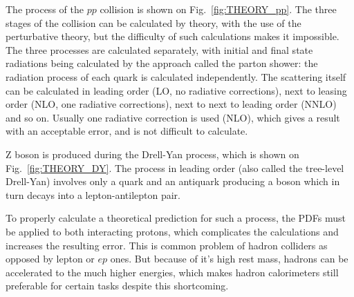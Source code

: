 The process of the $pp$ collision is shown on Fig.~\ref{fig:THEORY_pp}. The three stages of the collision can be calculated by theory, with the use of the perturbative theory, but the difficulty of such calculations makes it impossible. The three processes are calculated separately, with initial and final state radiations being calculated by the approach called the parton shower: the radiation process of each quark is calculated independently. The scattering itself can be calculated in leading order (LO, no radiative corrections), next to leasing order (NLO, one radiative corrections), next to next to leading order (NNLO) and so on. Usually one radiative correction is used (NLO), which gives a result with an acceptable error, and is not difficult to calculate.

\begin{figure}
\end{figure}

Z boson is produced during the Drell-Yan process, which is shown on Fig.~\ref{fig:THEORY_DY}. The process in leading order (also called the tree-level Drell-Yan) involves only a quark and an antiquark producing a boson which in turn decays into a lepton-antilepton pair.

To properly calculate a theoretical prediction for such a process, the PDFs must be applied to both interacting protons, which complicates the calculations and increases the resulting error. This is common problem of hadron colliders as opposed by lepton or $ep$ ones. But because of it's high rest mass, hadrons can be accelerated to the much higher energies, which makes hadron calorimeters still preferable for certain tasks despite this shortcoming.
